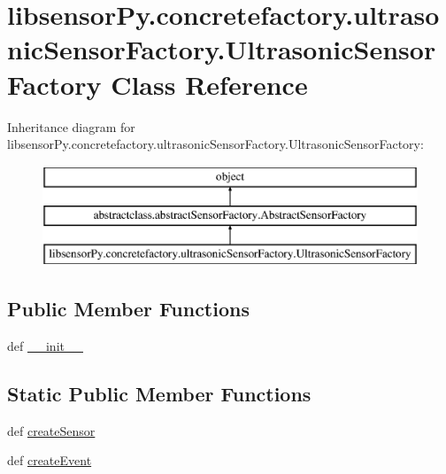 \hypertarget{classlibsensorPy_1_1concretefactory_1_1ultrasonicSensorFactory_1_1UltrasonicSensorFactory}{}\section{libsensor\+Py.\+concretefactory.\+ultrasonic\+Sensor\+Factory.\+Ultrasonic\+Sensor\+Factory Class Reference}
\label{classlibsensorPy_1_1concretefactory_1_1ultrasonicSensorFactory_1_1UltrasonicSensorFactory}
Inheritance diagram for libsensor\+Py.\+concretefactory.\+ultrasonic\+Sensor\+Factory.\+Ultrasonic\+Sensor\+Factory\+:\begin{figure}[H]
\begin{center}
\leavevmode
\includegraphics[height=3.000000cm]{classlibsensorPy_1_1concretefactory_1_1ultrasonicSensorFactory_1_1UltrasonicSensorFactory}
\end{center}
\end{figure}
\subsection*{Public Member Functions}
\begin{DoxyCompactItemize}
\item 
def \hyperlink{classlibsensorPy_1_1concretefactory_1_1ultrasonicSensorFactory_1_1UltrasonicSensorFactory_ac33cf1825e44cd73d24f3a4d585b17a6}{\+\_\+\+\_\+init\+\_\+\+\_\+}
\end{DoxyCompactItemize}
\subsection*{Static Public Member Functions}
\begin{DoxyCompactItemize}
\item 
def \hyperlink{classlibsensorPy_1_1concretefactory_1_1ultrasonicSensorFactory_1_1UltrasonicSensorFactory_a2e29761a5d6b7fa428cf147a20803d8d}{create\+Sensor}
\item 
def \hyperlink{classlibsensorPy_1_1concretefactory_1_1ultrasonicSensorFactory_1_1UltrasonicSensorFactory_a3b3f4384c6c4bf6b2347f70304d28e28}{create\+Event}
\end{DoxyCompactItemize}


